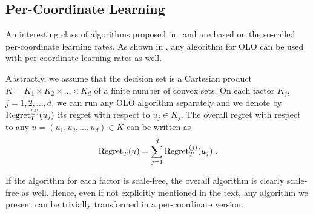 \subsection{Per-Coordinate Learning}

An interesting class of algorithms proposed in~\cite{McMahan-Streeter-2010} and
\cite{Duchi-Hazan-Singer-2011} are based on the so-called per-coordinate
learning rates.  As shown in \cite{Streeter-McMahan-2010}, any algorithm for OLO can be used with per-coordinate learning rates as well.

Abstractly, we assume that the decision set is a Cartesian product $K=K_1
\times K_2 \times \dots \times K_d$ of a finite number of convex sets.  On each
factor $K_j$, $j=1,2,\dots,d$, we can run any OLO algorithm separately and we
denote by $\operatorname{Regret}_T^{(j)}(u_j)$ its regret with respect to $u_j \in K_j$. The
overall regret with respect to any $u=(u_1, u_2, \dots, u_d) \in K$ can be
written as
$$
\operatorname{Regret}_T(u) = \sum_{j=1}^d \operatorname{Regret}_T^{(j)}(u_j) \; .
$$

If the algorithm for each factor is scale-free, the overall algorithm is
clearly scale-free as well. Hence, even if not explicitly mentioned in the text, any algorithm we present can be trivially transformed in a per-coordinate version.

